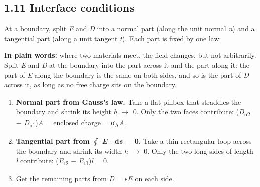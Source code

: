\documentclass[11pt]{article}
\begin{document}
\begin{keepsection}
\section{1.11 Interface conditions}

At a boundary, split \textit{E} and \textit{D} into a normal part (along the unit normal \textit{n}) and a tangential part (along a unit tangent \textit{t}). Each part is fixed by one law:

\begin{plainbox}\textbf{In plain words:} where two materials meet, the field changes, but not arbitrarily. Split \textit{E} and \textit{D} at the boundary into the part across it and the part along it: the part of \textit{E} along the boundary is the same on both sides, and so is the part of \textit{D} across it, as long as no free charge sits on the boundary.\end{plainbox}

\begin{enumerate}
\item \textbf{Normal part from Gauss’s law.} Take a flat pillbox that straddles the boundary and shrink its height \textit{h} \ensuremath{\to} 0. Only the two faces contribute: (\textit{D}\textsubscript{n2} \ensuremath{-} \textit{D}\textsubscript{n1})\textit{A} = enclosed charge = σ\textsubscript{A}\textit{A}.
\item \textbf{Tangential part from $\oint $ \textit{E} \ensuremath{\cdot} d\textit{s} = 0.} Take a thin rectangular loop across the boundary and shrink its width \textit{h} \ensuremath{\to} 0. Only the two long sides of length \textit{l} contribute: (\textit{E}\textsubscript{t2} \ensuremath{-} \textit{E}\textsubscript{t1})\textit{l} = 0.
\item Get the remaining parts from \textit{D} = ε\textit{E} on each side.
\end{enumerate}


\end{keepsection}
\end{document}
